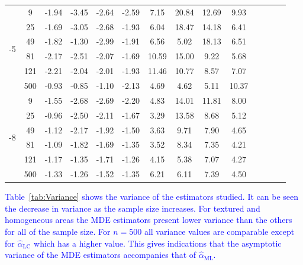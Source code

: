 \documentclass[twocolumn]{svjour3}
\begin{document}
\begin{table}[htbp]
\begin{tabular}{cc c*3{S[table-format=3.2]}  c*3{S[table-format=3.2]} c*3{S[table-format=3.2]}}
		\cmidrule(r){1-6} \cmidrule(r){7-10} \cmidrule(r){11-14}
		[2]{*}{-5} 
		&9     & -1.94 & -3.45 & -2.64 & -2.59 & 7.15  & 20.84 & 12.69 & 9.93 \\
		&25    & -1.69 & -3.05 & -2.68 & -1.93 & 6.04  & 18.47 & 14.18 & 6.41 \\
		&49    & -1.82 & -1.30 & -2.99 & -1.91 & 6.56  & 5.02  & 18.13 & 6.51 \\
		&81    & -2.17 & -2.51 & -2.07 & -1.69 & 10.59 & 15.00 & 9.22  & 5.68 \\
		&121   & -2.21 & -2.04 & -2.01 & -1.93 & 11.46 & 10.77 & 8.57  & 7.07 \\
		&500   & -0.93 & -0.85 & -1.10 & -2.13 & 4.69  & 4.62  & 5.11  & 10.37 \\		
		\cmidrule(r){1-6} \cmidrule(r){7-10} \cmidrule(r){11-14}
		[2]{*}{-8} 
		&9     & -1.55 & -2.68 & -2.69 & -2.20 & 4.83  & 14.01 & 11.81 & 8.00 \\
		&25    & -0.96 & -2.50 & -2.11 & -1.67 & 3.29  & 13.58 & 8.68  & 5.12 \\
		&49    & -1.12 & -2.17 & -1.92 & -1.50 & 3.63  & 9.71  & 7.90  & 4.65 \\
		&81    & -1.09 & -1.82 & -1.69 & -1.35 & 3.52  & 8.34  & 7.35  & 4.21 \\
		&121   & -1.17 & -1.35 & -1.71 & -1.26 & 4.15  & 5.38  & 7.07  & 4.27 \\
		&500   & -1.33 & -1.26 & -1.52 & -1.35 & 6.21  & 6.11  & 7.39  & 4.50 \\
		\bottomrule
	\end{tabular}%
	\label{tab:SkewKurt}%
\end{table}%


\textcolor{blue}{
Table~\ref{tab:Variance} shows the variance of the estimators studied. It can be seen the decrease in variance as the sample size increases. For textured and homogeneous areas the MDE estimators present lower variance than the others for all of the sample size. For $n=500$ all variance values are comparable except for $\widehat{\alpha}_{\text{{LC}}}$ which has a higher value. This gives indications that the asymptotic variance of the MDE estimators accompanies that of $\widehat{\alpha}_{\text{{ML}}}$.
}
\end{document}
